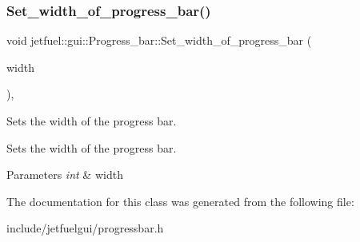 \subsubsection{\texorpdfstring{Set\+\_\+width\+\_\+of\+\_\+progress\+\_\+bar()}{Set\_width\_of\_progress\_bar()}}
{\footnotesize\ttfamily void jetfuel\+::gui\+::\+Progress\+\_\+bar\+::\+Set\+\_\+width\+\_\+of\+\_\+progress\+\_\+bar (\begin{DoxyParamCaption}\item[{const int}]{width }\end{DoxyParamCaption})\hspace{0.3cm}{\ttfamily [inline]}, {\ttfamily [protected]}}



Sets the width of the progress bar. 

Sets the width of the progress bar.


\begin{DoxyParams}{Parameters}
{\em int} & width \\
\hline
\end{DoxyParams}


The documentation for this class was generated from the following file\+:\begin{DoxyCompactItemize}
\item 
include/jetfuelgui/progressbar.\+h\end{DoxyCompactItemize}
